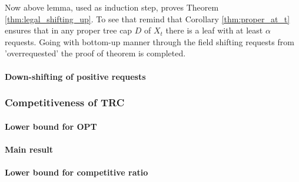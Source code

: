 Now above lemma, used as induction step, proves Theorem 
\ref{thm:legal_shifting_up}. To see that remind that 
Corollary \ref{thm:proper_at_t} ensures that in any proper tree cap $D$ of 
$X_t$ there is a leaf with at least $\alpha$ requests. Going with bottom-up 
manner through the field shifting requests from 'overrequested' the proof of 
theorem is completed.   
\paragraph{Down-shifting of positive requests}

\subsubsection{Competitiveness of TRC}
\paragraph{Lower bound for OPT}
\paragraph{Main result}
\paragraph{Lower bound for competitive ratio}
